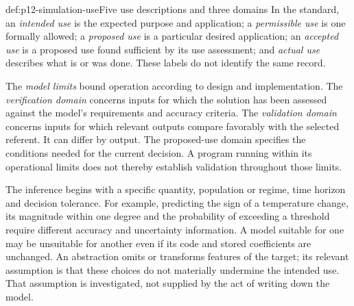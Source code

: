 \begin{hbdefinition}{def:p12-simulation-use}{Five use descriptions and three domains}
In the standard, an \emph{intended use} is the expected purpose and
application; a \emph{permissible use} is one formally allowed;
a \emph{proposed use} is a particular desired application;
an \emph{accepted use} is a proposed use found sufficient by its use
assessment; and \emph{actual use} describes what is or was done.
These labels do not identify the same record.

The \emph{model limits} bound operation according to design and
implementation. The \emph{verification domain} concerns inputs for
which the solution has been assessed against the model's requirements
and accuracy criteria. The \emph{validation domain} concerns inputs
for which relevant outputs compare favorably with the selected
referent. It can differ by output. The proposed-use domain specifies
the conditions needed for the current decision. A program running
within its operational limits does not thereby establish validation
throughout those limits.
\cite[Sections 3.2, 4.2.1.6--4.2.1.7 and E.3.4]{NASA7009B2024}
\end{hbdefinition}

The inference begins with a specific quantity, population or regime,
time horizon and decision tolerance. For example, predicting the sign
of a temperature change, its magnitude within one degree and the
probability of exceeding a threshold require different accuracy and
uncertainty information. A model suitable for one may be unsuitable
for another even if its code and stored coefficients are unchanged.
An abstraction omits or transforms features of the target; its relevant
assumption is that these choices do not materially undermine the
intended use. That assumption is investigated, not supplied by the
act of writing down the model.

